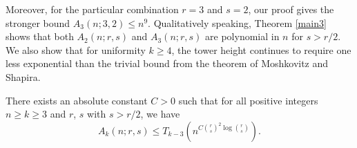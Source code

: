 Moreover, for the particular combination $r=3$ and $s=2$, our proof gives the stronger bound $A_{3}(n;3,2) \leq n^{9}$. Qualitatively speaking, Theorem \ref{main3} shows that both $A_2(n;r,s)$ and $A_3(n;r,s)$ are polynomial in $n$ for $s > r/2$. We also show that for uniformity $k \geq 4$, the tower height continues to require one less exponential than the trivial bound from the theorem of Moshkovitz and Shapira.

\begin{theorem}\label{maink}
    There exists an absolute constant $C > 0$ such that for all positive integers $n \geq k \geq 3$ and $r$, $s$ with $s > r/2$, we have
    \begin{equation*}
        A_k(n; r,s) \leq T_{k-3}\left(n^{C \binom{r}{s}^2 \log \binom{r}{s}}\right).
    \end{equation*}
\end{theorem}
